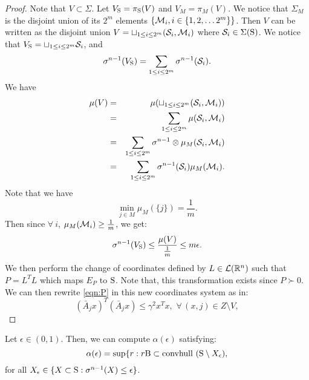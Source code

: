 \begin{proof}
Note that $V \subset \Sigma$. Let $V_{\text{S}} = \pi_{\text{S}}(V)$ and $V_M = \pi_M (V)$. We notice that $\Sigma_M$ is the disjoint union of its $2^m$ elements $\{\mathcal{M}_i, i \in \{1,2, \ldots 2^m\} \}$. Then $V$ can be written as the disjoint union $V = \sqcup_{1 \leq i \leq 2^m} (\mathcal{S}_i, \mathcal{M}_i)$ where $\mathcal{S}_i \in \Sigma(\text{S})$. We notice that 
$V_{\text{S}} = \sqcup_{1 \leq i \leq 2^m} \mathcal{S}_i$, 
and
\begin{equation*}
\sigma^{n-1} (V_{\text{S}}) = \sum_{1 \leq i \leq 2^m} \sigma^{n-1} (\mathcal{S}_i).
\end{equation*}
We have 
\begin{eqnarray*}
\mu(V) &=& \mu(\sqcup_{1 \leq i \leq 2^m} (\mathcal{S}_i, \mathcal{M}_i)) \\
&=& \sum_{1 \leq i \leq 2^m} \mu(\mathcal{S}_i, \mathcal{M}_i) \\
 &=& \sum_{1 \leq i \leq 2^m} \sigma^{n-1} \otimes \mu_M (\mathcal{S}_i, \mathcal{M}_i) \\
 & = &\sum_{1 \leq i \leq 2^m} \sigma^{n-1}(\mathcal{S}_i) \mu_M (\mathcal{M}_i).
\end{eqnarray*}
Note that we have $$\min_{j \in M} \mu_M(\{j\}) = \frac{1}{m}.$$ Then since $ \forall \ i$, $\mu_M(\mathcal{M}_i) \geq \frac{1}{m}$, we get:
\begin{equation}
\sigma^{n-1}(V_{\text{S}}) \leq \frac{\mu(V)}{\frac{1}{m}} \leq m \epsilon.
\end{equation}
We then perform the change of coordinates defined by $L \in \mathcal{L}(\mathbb{R}^n)$ such that $P=L^TL$ which maps $E_P$ to $\text{S}$. Note that, this transformation exists since $P \succ 0$. We can then rewrite
\eqref{eqn:P} in this new coordinates system as in: 
\begin{equation}\label{eqn:P}(\bar{A}_j x)^T(\bar{A}_j x) \leq {\gamma}^2x^Tx,\,\, \forall\, (x, j) \in Z \setminus V,\end{equation}


\end{proof}


\begin{lemma}\label{lemma:eps}Let $\epsilon \in (0, 1)$. Then, we can compute $\alpha(\epsilon)$ satisfying:
\begin{equation}\label{eqn:ballinc}\alpha(\epsilon) = \sup\{r: r\text{B} \subset \mbox{convhull }(\text{S} \setminus X_\epsilon),
\end{equation}
for all $X_\epsilon \in \{X \subset \text{S}: \sigma^{n-1}(X) \leq \epsilon\}$. 
\end{lemma}

